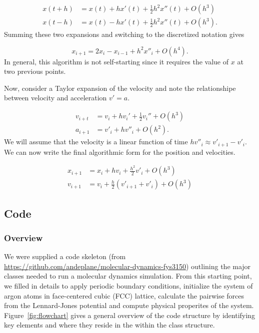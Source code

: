 \documentclass[10pt,showpacs,preprintnumbers,footinbib,amsmath,amssymb,aps,prl,twocolumn,groupedaddress,superscriptaddress,showkeys]{revtex4-1}
\begin{document}
\begin{align*}
	x(t+h) &= x(t) + h x'(t) + \frac{1}{2} h^2  x''(t) + O(h^3)\\
	x(t-h) &= x(t)  - h x'(t) + \frac{1}{2} h^2  x''(t) + O(h^3).
\end{align*}
Summing these two expansions and switching to the discretized
notation gives

\begin{equation*}
	x_{i+1} = 2 x_i - x_{i-1} + h^2 x''_i + O(h^4).
\end{equation*}
In general, this algorithm is not self-starting since it requires the
value of $x$ at two previous points.

Now, consider a Taylor expansion of the velocity and note the
relationshipe between velocity and acceleration $v' = a$.

\begin{align*}
	v_{i+t} &= v_i + h v_i ' + \frac{1}{2} v_i '' + O(h^3)\\
	a_{i+1} &= v'_i + h v''_i + O(h^2).
\end{align*}
We will assume that the velocity is a linear function of time
$hv''_i \approx v'_{i+1} - v'_i$. We can now write the final
algorithmic form for the position and velocities.

\begin{align}
	x_{i+1} &= x_i + hv_i + \frac{h^2}{2} v'_i + O(h^3)\\
	v_{i+1} &= v_i + \frac{h}{2}(v'_{i+1} + v'_i) + O(h^3)
\label{eq:Verlet}
\end{align}

\subsection*{Code}

\subsubsection*{Overview}

We were supplied a code skeleton (from
\url{ https://github.com/andeplane/molecular-dynamics-fys3150})
 outlining the major classes needed to run a molecular dynamics
simulation. From this starting point, we filled in details to apply
periodic boundary conditions, initialize the system of argon
atoms in face-centered cubic (FCC) lattice, calculate the pairwise
forces from the Lennard-Jones potential and compute physical
properites of the system. Figure~\ref{fig:flowchart} gives a
general overview of the code structure by identifying key
elements and where they reside in the within the class structure.
\end{document}
